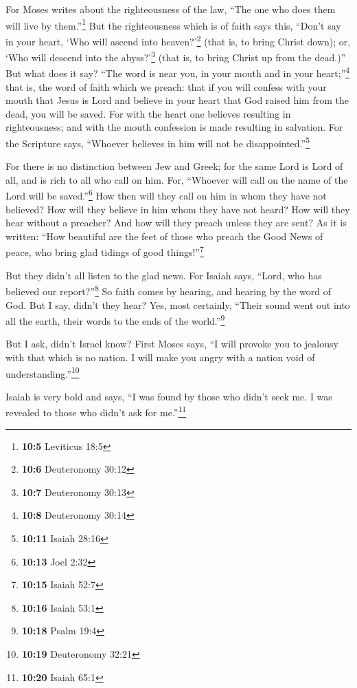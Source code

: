  For Moses writes about the righteousness of the law,
``The one who does them will live by them.''\footnote{\textbf{10:5}
  Leviticus 18:5}  But the righteousness which is of faith
says this, ``Don't say in your heart, `Who will ascend into
heaven?'\footnote{\textbf{10:6} Deuteronomy 30:12} (that is, to bring
Christ down);  or, `Who will descend into the
abyss?'\footnote{\textbf{10:7} Deuteronomy 30:13} (that is, to bring
Christ up from the dead.)''  But what does it say? ``The
word is near you, in your mouth and in your heart;''\footnote{\textbf{10:8}
  Deuteronomy 30:14} that is, the word of faith which we preach:
 that if you will confess with your mouth that Jesus is
Lord and believe in your heart that God raised him from the dead, you
will be saved.  For with the heart one believes resulting
in righteousness; and with the mouth confession is made resulting in
salvation.  For the Scripture says, ``Whoever believes in
him will not be disappointed.''\footnote{\textbf{10:11} Isaiah 28:16}

 For there is no distinction between Jew and Greek; for
the same Lord is Lord of all, and is rich to all who call on him.
 For, ``Whoever will call on the name of the Lord will be
saved.''\footnote{\textbf{10:13} Joel 2:32}  How then
will they call on him in whom they have not believed? How will they
believe in him whom they have not heard? How will they hear without a
preacher?  And how will they preach unless they are sent?
As it is written: ``How beautiful are the feet of those who preach the
Good News of peace, who bring glad tidings of good things!''\footnote{\textbf{10:15}
  Isaiah 52:7}

 But they didn't all listen to the glad news. For Isaiah
says, ``Lord, who has believed our report?''\footnote{\textbf{10:16}
  Isaiah 53:1}  So faith comes by hearing, and hearing by
the word of God.  But I say, didn't they hear? Yes, most
certainly, ``Their sound went out into all the earth, their words to the
ends of the world.''\footnote{\textbf{10:18} Psalm 19:4}

 But I ask, didn't Israel know? First Moses says, ``I
will provoke you to jealousy with that which is no nation. I will make
you angry with a nation void of understanding.''\footnote{\textbf{10:19}
  Deuteronomy 32:21}

 Isaiah is very bold and says, ``I was found by those who
didn't seek me. I was revealed to those who didn't ask for
me.''\footnote{\textbf{10:20} Isaiah 65:1}

